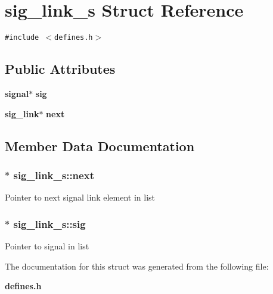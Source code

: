 \section{sig\_\-link\_\-s  Struct Reference}
\label{structsig__link__s}
{\tt \#include $<$defines.h$>$}

\subsection*{Public Attributes}
\begin{CompactItemize}
\item 
{\bf signal}$\ast$ {\bf sig}
\item 
{\bf sig\_\-link}$\ast$ {\bf next}
\end{CompactItemize}


\subsection{Member Data Documentation}
\subsubsection{ $\ast$ sig\_\-link\_\-s::next}\label{structsig__link__s_m1}


Pointer to next signal link element in list 
\subsubsection{ $\ast$ sig\_\-link\_\-s::sig}\label{structsig__link__s_m0}


Pointer to signal in list 

The documentation for this struct was generated from the following file:\begin{CompactItemize}
\item 
{\bf defines.h}\end{CompactItemize}
